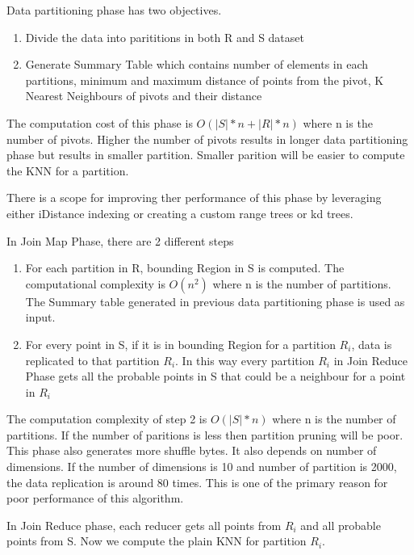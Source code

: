\documentclass[conference]{IEEEtran}
\begin{document}
\bigskip

Data partitioning phase has two objectives.
\begin{enumerate}
\item Divide the data into parititions in both R and S dataset
\item Generate Summary Table which contains number of elements in each
  partitions, minimum and maximum distance of points from the pivot, K
  Nearest Neighbours of pivots and their distance
\end{enumerate}

The computation cost of this phase is $O(|S|*n + |R|*n)$ where n is
the number of pivots. Higher the number of pivots results in longer
data partitioning phase but results in smaller partition. Smaller
parition will be easier to compute the KNN for a partition.

There is a scope for improving ther performance of this phase by
leveraging either iDistance indexing \cite{jagadish_idistance:_2005}
or creating a custom range trees or kd trees.

\bigskip

In Join Map Phase, there are 2 different steps
\begin{enumerate}
\item For each partition in R, bounding Region in S is computed. The
  computational complexity is $O(n^2)$ where n is the number of
  partitions. The Summary table generated in previous data
  partitioning phase is used as input.
\item For every point in S, if it is in bounding Region for a
  partition $R_i$, data is replicated to that partition $R_i$. In this way
  every partition $R_i$ in Join Reduce Phase gets all the probable
  points in S that could be a neighbour for a point in $R_i$
\end{enumerate}

The computation complexity of step 2 is $O(|S| * n)$ where n is the
number of partitions. If the number of paritions is less then
partition pruning will be poor. This phase also generates more shuffle
bytes. It also depends on number of dimensions. If the number of
dimensions is 10 and number of partition is 2000, the data replication
is around 80 times. This is one of the primary reason for poor
performance of this algorithm.

\bigskip

In Join Reduce phase, each reducer gets all points from $R_i$ and all
probable points from S. Now we compute the plain KNN for partition
$R_i$.
\end{document}
